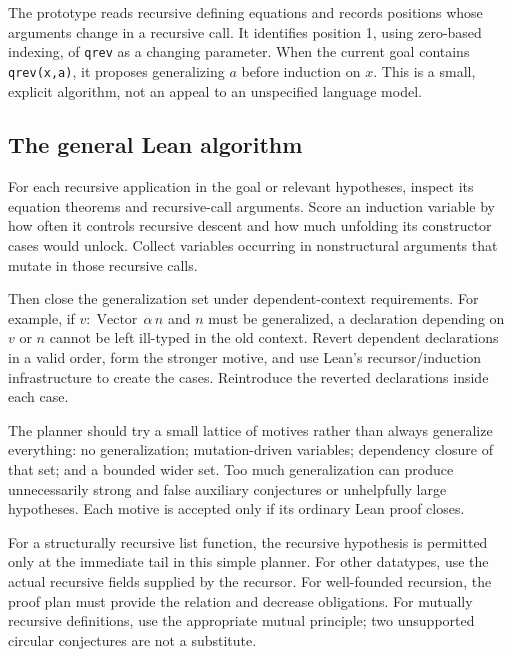 \documentclass[11pt,letterpaper]{article}
\newcommand{\code}[1]{\texttt{#1}}
\theoremstyle{definition}\newtheorem{definition}[theorem]{Definition}
\theoremstyle{remark}\newtheorem{remark}[theorem]{Remark}
\begin{document}
The prototype reads recursive defining equations and records positions whose arguments change in a recursive call. It identifies position 1, using zero-based indexing, of \code{qrev} as a changing parameter. When the current goal contains \code{qrev(x,a)}, it proposes generalizing $a$ before induction on $x$. This is a small, explicit algorithm, not an appeal to an unspecified language model.

\subsection{The general Lean algorithm}
For each recursive application in the goal or relevant hypotheses, inspect its equation theorems and recursive-call arguments. Score an induction variable by how often it controls recursive descent and how much unfolding its constructor cases would unlock. Collect variables occurring in nonstructural arguments that mutate in those recursive calls.

Then close the generalization set under dependent-context requirements. For example, if $v:\operatorname{Vector}\,\alpha\,n$ and $n$ must be generalized, a declaration depending on $v$ or $n$ cannot be left ill-typed in the old context. Revert dependent declarations in a valid order, form the stronger motive, and use Lean's recursor/induction infrastructure to create the cases. Reintroduce the reverted declarations inside each case.

The planner should try a small lattice of motives rather than always generalize everything: no generalization; mutation-driven variables; dependency closure of that set; and a bounded wider set. Too much generalization can produce unnecessarily strong and false auxiliary conjectures or unhelpfully large hypotheses. Each motive is accepted only if its ordinary Lean proof closes.

For a structurally recursive list function, the recursive hypothesis is permitted only at the immediate tail in this simple planner. For other datatypes, use the actual recursive fields supplied by the recursor. For well-founded recursion, the proof plan must provide the relation and decrease obligations. For mutually recursive definitions, use the appropriate mutual principle; two unsupported circular conjectures are not a substitute.
\end{document}
